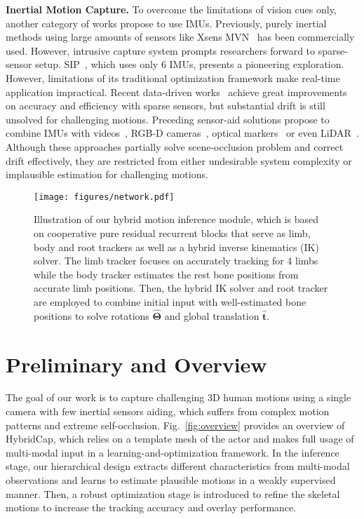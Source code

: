 \documentclass[letterpaper]{article} \usepackage{aaai23}  \usepackage{times}  \usepackage{helvet}  \usepackage{courier}  \usepackage[hyphens]{url}  \usepackage{graphicx} \urlstyle{rm} \def\UrlFont{\rm}  \usepackage{natbib}  \usepackage{caption} \frenchspacing  \setlength{\pdfpagewidth}{8.5in}  \setlength{\pdfpageheight}{11in}  \usepackage{algorithm}
\newcommand{\myparagraph}[1]{\vspace{0.1em}\noindent\textbf{#1}}
\begin{document}
\myparagraph{Inertial Motion Capture.}
To overcome the limitations of vision cues only, another category of works propose to use IMUs. 
Previously, purely inertial methods using large amounts of sensors like Xsens MVN~\cite{XSENS} has been commercially used. However, intrusive capture system prompts researchers forward to sparse-sensor setup. SIP~\cite{von2017SIP}, which uses only 6 IMUs, presents a pioneering exploration. However, limitations of its traditional optimization framework make real-time application impractical. Recent data-driven works~\cite{huang2018DIP,TransPose2021,PIPCVPR2022} achieve great improvements on accuracy and efficiency with sparse sensors, but substantial drift is still unsolved for challenging motions.
Preceding sensor-aid solutions propose to combine IMUs with videos~\cite{gilbert2019fusing,henschel2020accurate,malleson2019real,malleson2017real}, RGB-D cameras~\cite{helten2013real,Zheng2018HybridFusion}, optical markers~\cite{Andrews2016} 
or even LiDAR~\cite{10049734}. 
Although these approaches partially solve scene-occlusion problem and correct drift effectively, they are restricted from either undesirable system complexity or implausible estimation for challenging motions.

 \begin{figure*}[t]
	\centering
	\texttt{[image: figures/network.pdf]}
	\caption{Illustration of our hybrid motion inference module, which is based on cooperative pure residual recurrent blocks that serve as limb, body and root trackers as well as a hybrid inverse kinematics (IK) solver. The limb tracker focuses on accurately tracking for 4 limbs while the body tracker estimates the rest bone positions from accurate limb positions. Then, the hybrid IK solver and root tracker are employed to combine initial input with well-estimated bone positions to solve rotations $\mathbf{\hat{\Theta}}$ and global translation $\mathbf{\hat{t}}$.}
	\label{fig:fig_3_network}
	\vspace{-3mm}
\end{figure*}

\section{Preliminary and Overview}
The goal of our work is to capture challenging 3D human motions using a single camera with few inertial sensors aiding, which suffers from complex motion patterns and extreme self-occlusion.
Fig.~\ref{fig:overview} provides an overview of HybridCap, which relies on a template mesh of the actor and makes full usage of multi-modal input in a learning-and-optimization framework.
In the inference stage, our hierarchical design extracts different characteristics from multi-modal observations and learns to estimate plausible motions in a weakly supervised manner. 
Then, a robust optimization stage is introduced to refine the skeletal motions to increase the tracking accuracy and overlay performance.
\end{document}
